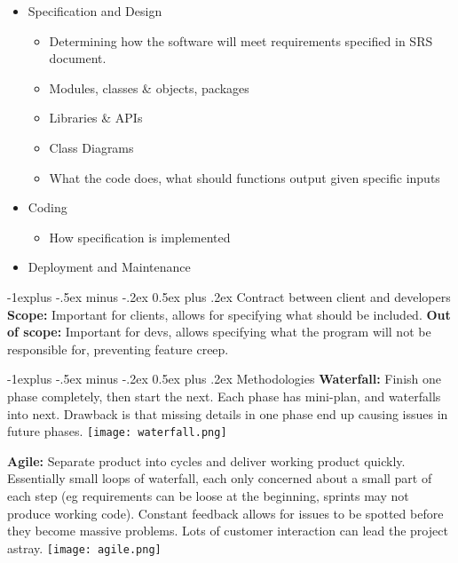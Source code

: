 \documentclass[letterpaper, 8pt]{extarticle}
\makeatletter
\renewcommand{\subsection}{\@startsection{subsection}{2}{0mm}%
                                {-1explus -.5ex minus -.2ex}%
                                {0.5ex plus .2ex}%
                                {\normalfont\small\bfseries}}
\makeatother
\begin{document}
\begin{multicols*}{6}
\begin{itemize}
\begin{itemize}
\begin{itemize}
                        \end{itemize}
              \end{itemize}
        \item Specification and Design
              \begin{itemize}
                  \item Determining how the software will meet requirements specified in SRS document.
                  \item Modules, classes \& objects, packages
                  \item Libraries \& APIs
                  \item Class Diagrams
                  \item What the code does, what should functions output given specific inputs
              \end{itemize}
        \item Coding
              \begin{itemize}
                  \item How specification is implemented
              \end{itemize}
        \item Deployment and Maintenance
    \end{itemize}
    \subsection{Contract between client and developers}
    \textbf{Scope:} Important for clients, allows for specifying what should be included.
    \textbf{Out of scope:} Important for devs, 
    allows specifying what the program will not be responsible for,
    preventing feature creep.

    \subsection{Methodologies}
    \textbf{Waterfall:} Finish one phase completely, then start the next.
    Each phase has mini-plan, and waterfalls into next.
    Drawback is that missing details in one phase
    end up causing issues in future phases.
    \texttt{[image: waterfall.png]}

    \textbf{Agile:} Separate product into cycles
    and deliver working product quickly.
    Essentially small loops of waterfall,
    each only concerned about a small part of each step
    (eg requirements can be loose at the beginning, sprints may not produce working code).
    Constant feedback allows for issues to be spotted before they become massive problems.
    Lots of customer interaction can lead the project astray.
    \texttt{[image: agile.png]}


\end{multicols*}
\end{document}
